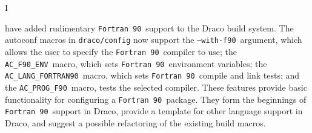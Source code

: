 \documentclass[11pt]{nmemo}
\newcommand{\fninety}{\texttt{Fortran~90}}
\newcommand{\withfninety}{\texttt{--with-f90}}
\newcommand{\fninetyenv}{\texttt{AC\_F90\_ENV}}
\newcommand{\langfninety}{\texttt{AC\_LANG\_FORTRAN90}}
\newcommand{\progfninety}{\texttt{AC\_PROG\_F90}}
\begin{document}

\subject{\fninety\ Build Support in Draco}
\date{April 25, 2000}




\opening


I have added rudimentary \fninety\ support to the Draco build
system\cite{draco-build}.  The autoconf\cite{autoconf} macros in
\texttt{draco/config} now support the \withfninety\ argument, which
allows the user to specify the \fninety\ compiler to use; the
\fninetyenv\ macro, which sets \fninety\ environment variables; the
\langfninety\ macro, which sets \fninety\ compile and link tests; and
the \progfninety\ macro, tests the selected compiler.  These features
provide basic functionality for configuring a \fninety\ package.  They
form the beginnings of \fninety\ support in Draco, provide a template
for other language support in Draco, and suggest a possible
refactoring of the existing build macros.
\end{document}
